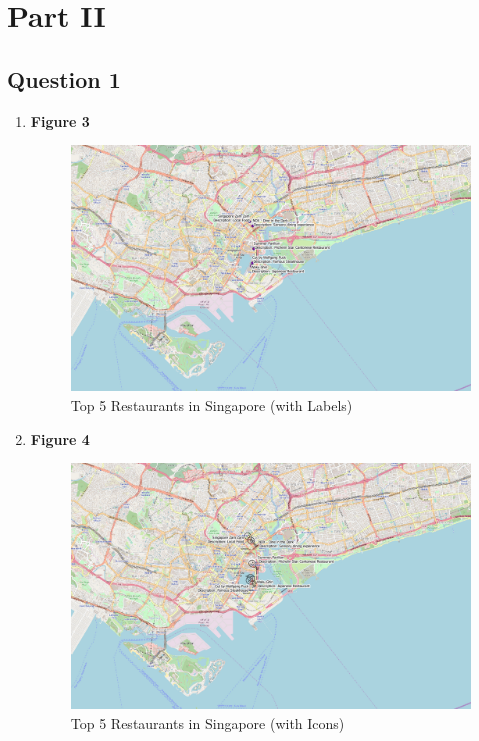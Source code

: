 \documentclass[a4paper, fleqn]{article}
\begin{document}
\section{Part II}

\subsection{Question 1}

\begin{enumerate}[label=(\alph{*})]
\item \textbf{Figure 3}\\
\begin{figure}[h!]
\includegraphics[width=\linewidth]{./assets/201802071629.png}
\caption{Top 5 Restaurants in Singapore (with Labels)}
\label{figure:map3}
\end{figure}

\pagebreak

\item \textbf{Figure 4}\\
\begin{figure}[h!]
\includegraphics[width=\linewidth]{./assets/201802071645.png}
\caption{Top 5 Restaurants in Singapore (with Icons)}
\label{figure:map4}
\end{figure}
\end{enumerate}
\end{document}
